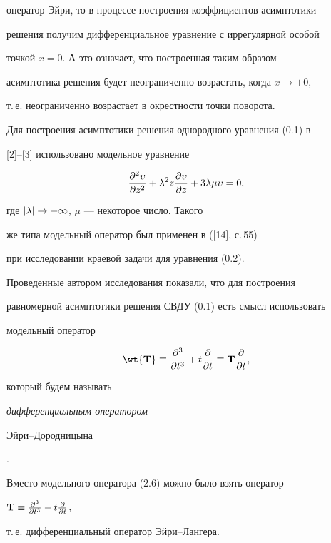 оператор Эйри, то в процессе построения коэффициентов асимптотики


решения получим дифференциальное уравнение с иррегулярной особой


точкой $x=0$. А это означает, что построенная таким образом


асимптотика решения будет неограниченно возрастать, когда $x \to+0$,


т.\,е. неограниченно возрастает в окрестности точки поворота.





Для построения асимптотики решения однородного уравнения (0.1) в


[2]--[3] использовано модельное уравнение


\begin{equation}


\frac{\d^2 \upsilon}{\d z^2} + \l^2 z \frac{\d \upsilon}{\d z} +


3 \l \mu \upsilon =0, 


\end{equation}


где $| \lambda | \to + \infty $, $\mu$ --- некоторое число. Такого


же типа модельный оператор был применен в ([14], с.\,55)


при исследовании краевой задачи для уравнения (0.2).





Проведенные автором исследования показали, что для построения


равномерной асимптотики решения СВДУ (0.1) есть смысл использовать


модельный оператор 


\begin{equation}


\wt{\bold{T}} \equiv \frac{\d^3}{\d t^3} + t \frac{\d}{\d t} \equiv


\bold{T}


\frac{\partial}{\partial t}, 


\end{equation}


который будем называть { \it дифференциальным оператором


Эйри--Дородницына}.





\begin{note}


Вместо модельного оператора (2.6) можно было взять оператор


$\bold{T} \equiv \frac{\partial^3}{\partial t^3} - t \frac{\partial}{\partial t}$,


т.\,е. дифференциальный оператор Эйри--Лангера.


\end{note}





